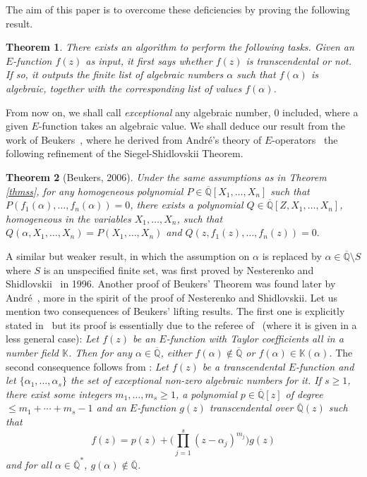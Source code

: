 \documentclass[reqno,english,12pt,a4paper]{smfart}
\newtheorem{thm}{Theorem}
\numberwithin{equation}{section}
\def\Qbar{\overline{\mathbb Q}}
\begin{document}
The aim of this paper is to overcome these deficiencies by proving the following result.

\begin{thm} \label{thmmain} There exists an algorithm to perform the following tasks.  
Given an $E$-function $f(z)$ as input, it first says whether $f(z)$ is transcendental or not. If so, it  outputs  the finite list of algebraic numbers $\alpha$ such that $f(\alpha)$ is algebraic, together with the corresponding list of values $f(\alpha)$. 
\end{thm}

From now on, we shall call {\em exceptional} any algebraic number, $0$ included,  where a given $E$-function takes an algebraic value. 
We shall deduce our result from the work of Beukers~\cite{beukers}, where he derived from Andr\'e's theory of $E$-operators~\cite{andre} the following refinement of the 
Siegel-Shidlovskii Theorem.    
 
 \begin{thm}[Beukers, 2006]\label{thm:ns} Under the same assumptions as in Theorem \ref{thmss},  
for any homogeneous polynomial $P\in \Qbar[X_1,\ldots, X_n]$ such that 
$P(f_1( \alpha),\ldots, f_n( \alpha))=0$, there exists a polynomial $Q\in \Qbar[Z, X_1, \ldots, X_n]$, 
homogeneous in the variables $X_1,\ldots,X_n$, such that $Q(\alpha, X_1,\ldots, X_n)=P(X_1,\ldots, X_n)$ 
and
$
Q(z,f_1(z),\ldots, f_n(z))=0.
$
\end{thm}

A similar but weaker result, in which the assumption on $\alpha$ is replaced by $\alpha\in \Qbar\setminus S$  
where $S$ is an unspecified finite set, was first proved by Nesterenko and Shidlovskii~\cite{ns} in 1996. 
Another proof of Beukers' Theorem was found later by Andr\'e~\cite{andreens}, more in the spirit of the proof of Nesterenko and Shidlovskii.   
Let us mention two consequences of Beukers' lifting  results. 
The first one is explicitly stated in~\cite{ateo} but its proof is essentially due to the referee of~\cite{firi} (where it is given in a less general case): {\em 
Let $f(z)$ be an $E$-function with Taylor coefficients all in a number field $\mathbb K$. Then for any 
$\alpha \in \Qbar$, either $f(\alpha)\notin \Qbar$ or $f(\alpha)\in \mathbb K(\alpha)$.} 
The second consequence follows from \cite[Proposition 4.1]{beukers}: {\em Let $f(z)$ be a transcendental $E$-function and let $\{\alpha_1, \ldots, \alpha_s\}$ the set of exceptional non-zero algebraic numbers for it. If $s\ge 1$,  there exist some 
integers $m_1, \ldots, m_s \ge 1$, a polynomial $p\in \Qbar[z]$ of degree $\le m_1+\cdots +m_s-1$ and an $E$-function $g(z)$ transcendental over $\Qbar(z)$ such that
$$
f(z)=p(z) + \Big(\prod_{j=1}^s (z-\alpha_j)^{m_j}\Big) g(z)
$$
and for all $\alpha\in \Qbar^*$, $g(\alpha)\notin \Qbar$.}
\end{document}
